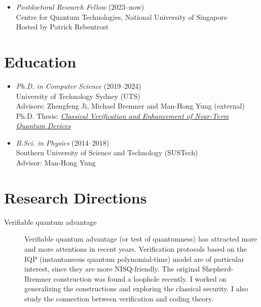 \documentclass[margin,line,a4paper]{resume}
\begin{document}
\begin{resume}
\begin{itemize}
    \item \textit{Postdoctoral Research Fellow} (2023--now) \\
    Centre for Quantum Technologies, National University of Singapore  \\
    Hosted by Patrick Rebentrost
\end{itemize}


\section{\mysidestyle Education}\vspace{1mm}

\begin{itemize}
    \item \textit{Ph.D. in Computer Science} (2019--2024) \\
    University of Technology Sydney (UTS)  \\
    Advisors: Zhengfeng Ji, Michael Bremner and Man-Hong Yung (external) \\
    Ph.D. Thesis: \textit{\href{https://www.proquest.com/openview/e93d79149c773ca1b42e21ee73e8cc45/1?pq-origsite=gscholar&cbl=2026366&diss=y}{Classical Verification and Enhancement of Near-Term Quantum Devices}}

    \item \textit{B.Sci. in Physics} (2014--2018) \\
    Southern University of Science and Technology (SUSTech) \\
    Advisor: Man-Hong Yung
\end{itemize}





\iffalse
\section{\mysidestyle Research Directions}\vspace{1mm}

\begin{description}
    \item[Verifiable quantum advantage] Verifiable quantum advantage (or test of quantumness) has attracted more and more attentions in recent years. Verification protocols based on the IQP (instantaneous quantum polynomial-time) model are of particular interest, since they are more NISQ-friendly. The original Shepherd-Bremner construction was found a loophole recently. I worked on generalizing the constructions and exploring the classical security. I also study the connection between verification and coding theory.


\end{description}
\end{resume}
\end{document}
